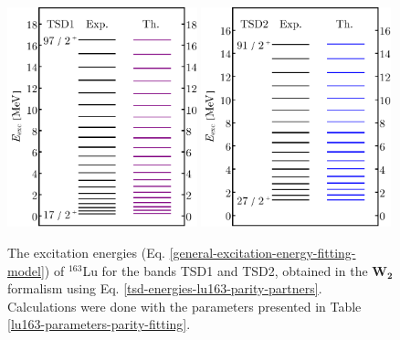 \begin{figure}
    \centering
    \includegraphics[width=0.49\textwidth]{Chapters/Figures/parity-partners-plots/tsd1.pdf}
    \includegraphics[width=0.49\textwidth]{Chapters/Figures/parity-partners-plots/tsd2.pdf}
    \caption{The excitation energies (Eq. \ref{general-excitation-energy-fitting-model}) of $^{163}$Lu for the bands TSD1 and TSD2, obtained in the $\mathbf{W_2}$ formalism using Eq. \ref{tsd-energies-lu163-parity-partners}. Calculations were done with the parameters presented in Table \ref{lu163-parameters-parity-fitting}.}
    \label{results-parity-partners-163lu-1}
\end{figure}
